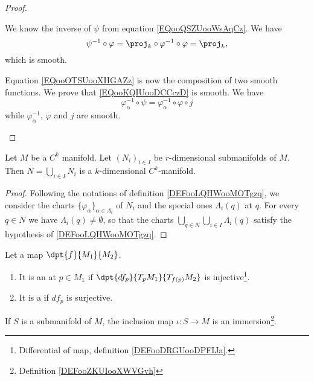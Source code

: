 \begin{proof}
\begin{subproof}
		We know the inverse of \( \psi\) from equation \eqref{EQooQSZUooWsAqCz}. We have
		\begin{equation}
			\psi^{-1}\circ\varphi=\proj_k\circ\varphi^{-1}\circ\varphi=\proj_k,
		\end{equation}
		which is smooth.

		Equation \eqref{EQooOTSUooXHGAZz} is now the composition of two smooth functions.
		We prove that \eqref{EQooKQIUooDCCczD} is smooth. We have
		\begin{equation}
			\varphi_{\alpha}^{-1}\circ\psi=\varphi_{\alpha}^{-1}\circ\varphi\circ j
		\end{equation}
		while \( \varphi_{\alpha}^{-1}\), \( \varphi\) and \( j\) are smooth.
	\end{subproof}
\end{proof}

\begin{proposition}	\label{PROPooFFDYooLmwISw}
	Let \( M\) be a \( C^k\) manifold. Let \( (N_i)_{i\in I}\) be \( r\)-dimensional submanifolds of \( M\). Then \( N=\bigcup_{i\in I}N_i\) is a \( k\)-dimensional \( C^k\)-manifold.
\end{proposition}

\begin{proof}
	Following the notations of definition \ref{DEFooLQHWooMOTgzq}, we consider the charts \( \{ \varphi_{\alpha} \}_{\alpha\in\Lambda_i}\) of \( N_i\) and the special ones \( \Lambda_i(q)\) at \( q\). For every \( q\in N\) we have \( \Lambda_i(q)\neq \emptyset\), so that the charts \( \bigcup_{q\in N}\bigcup_{i\in I}\Lambda_i(q)\) satisfy the hypothesis of \ref{DEFooLQHWooMOTgzq}.
\end{proof}

\begin{definition}      \label{DEFooZKUIooXWVGvh}
	Let a map $\dpt{f}{M_1}{M_2}$.
	\begin{enumerate}
		\item
		      It is an  at $p\in M_1$ if $\dpt{df_p}{T_pM_1}{T_{f(p)}M_2}$ is injective\footnote{Differential of map, definition \ref{DEFooDRGUooDPFIJa}.}.
		\item
		      It is a  if $df_p$ is surjective.
	\end{enumerate}
\end{definition}


\begin{proposition}       \label{PROPooEWUCooTStAvb}
	If \( S\) is a submanifold of \( M\), the inclusion map \( \iota\colon S \to M\) is an immersion\footnote{Definition \ref{DEFooZKUIooXWVGvh}}.
\end{proposition}

